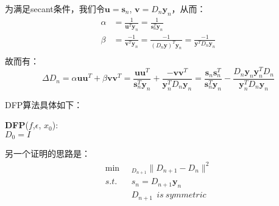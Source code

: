 为满足secant条件，我们令$\mathbf{u}= \mathbf{s}_n$, $\mathbf{v} = D_n\mathbf{y}_n$，从而：
\begin{displaymath}
\begin{split}
\alpha &=\frac{1}{\mathbf{u}^T \mathbf{y}_n} =\frac{1}{\mathbf{s}_n^T\mathbf{y}_n}\\
\beta &= \frac{-1}{\mathbf{v}^T \mathbf{y}_n} = \frac{-1}{(D_n\mathbf{y})^T \mathbf{y}_n} = \frac{-1}{\mathbf{y}^T D_n \mathbf{y}_n}\\
\end{split}
\end{displaymath}
故而有：
\begin{displaymath}
\Delta D_n = \alpha\mathbf{uu}^T + \beta \mathbf{vv}^T
=\frac{\mathbf{uu}^T}{\mathbf{s}_n^T\mathbf{y}_n} + \frac{-\mathbf{vv}^T}{\mathbf{y}_n^T D_n \mathbf{y}_n}
=\frac{\mathbf{s}_n\mathbf{s}_n^T}{\mathbf{s}_n^T\mathbf{y}_n} - \frac{D_n\mathbf{y}_n\mathbf{y}_n^TD_n}{\mathbf{y}_n^T D_n \mathbf{y}_n}
\end{displaymath}

DFP算法具体如下：

\begin{minipage}{0.8\textwidth}\centering
\begin{algorithm}[H]
\textbf{DFP}($f$,$\epsilon$, $x_0$):\\
$D_0 = I$\\
\end{algorithm}
\end{minipage}

另一个证明的思路是：
\begin{displaymath}
\begin{split}
\min & _{D_{n+1}}{\lVert D_{n+1}-D_n \rVert ^2}\\
s.t.~~~~ &s_n = D_{n+1}\mathbf{y}_n\\
&D_{n+1}~~ is~ symmetric
\end{split}
\end{displaymath}

